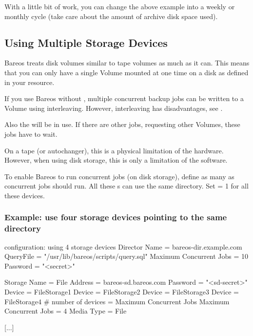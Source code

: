 With a little bit of work, you can change the above example into a weekly or
monthly cycle (take care about the amount of archive disk space used).



\subsection{Using Multiple Storage Devices}
\label{sec:MultipleStorageDevices}


Bareos treats disk volumes similar to tape volumes as much as it can.
This means that you can only have a single Volume mounted at one time on a disk as defined in your  resource.

If you use Bareos without ,
multiple concurrent backup jobs can be written to a Volume using interleaving.
However, interleaving has disadvantages, see .

Also the  will be in use. If there are other jobs, requesting other Volumes,
these jobs have to wait.

On a tape (or autochanger), this is a physical limitation of the hardware.
However, when using disk storage, this is only a limitation of the software.

To enable Bareos to run concurrent jobs (on disk storage), define as many  as concurrent jobs should run.
All these s can use the same  directory. Set  = 1 for all these devices.

\subsubsection{Example: use four storage devices pointing to the same directory}

\begin{bconfig}{\bareosDir configuration: using 4 storage devices}
Director {
  Name = bareos-dir.example.com
  QueryFile = "/usr/lib/bareos/scripts/query.sql"
  Maximum Concurrent Jobs = 10
  Password = "<secret>"
}

Storage {
  Name = File
  Address = bareos-sd.bareos.com
  Password = "<sd-secret>"
  Device = FileStorage1
  Device = FileStorage2
  Device = FileStorage3
  Device = FileStorage4
  # number of devices = Maximum Concurrent Jobs
  Maximum Concurrent Jobs = 4
  Media Type = File
}

[...]
\end{bconfig}


